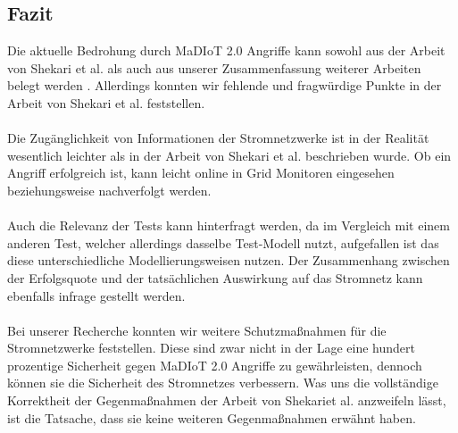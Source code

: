 \documentclass[
    a4paper,
    pagesize,
	pdftex,
    12pt,
]{scrartcl}
\begin{document}
\begin{multicols}{2}
\section{Fazit}
Die aktuelle Bedrohung durch MaDIoT 2.0 Angriffe kann sowohl aus der Arbeit von Shekari et al. als auch aus unserer Zusammenfassung weiterer Arbeiten belegt werden \cite{280016}. Allerdings konnten wir fehlende und fragwürdige Punkte in der Arbeit von Shekari et al. feststellen. \\ \\ Die Zugänglichkeit von Informationen der Stromnetzwerke ist in der Realität wesentlich leichter als in der Arbeit von Shekari et al. beschrieben wurde. Ob ein Angriff erfolgreich ist, kann leicht online in \glqq Grid Monitoren\grqq{} eingesehen beziehungsweise nachverfolgt werden. \\ \\
Auch die Relevanz der Tests kann hinterfragt werden, da im Vergleich mit einem anderen Test, welcher allerdings dasselbe Test-Modell nutzt, aufgefallen ist das diese unterschiedliche Modellierungsweisen nutzen. Der Zusammenhang zwischen der Erfolgsquote und der tatsächlichen Auswirkung auf das Stromnetz kann ebenfalls infrage gestellt werden.\\ \\ Bei unserer Recherche konnten wir weitere Schutzmaßnahmen für die Stromnetzwerke feststellen. Diese sind zwar nicht in der Lage eine hundert prozentige Sicherheit gegen MaDIoT 2.0 Angriffe zu gewährleisten, dennoch können sie die Sicherheit des Stromnetzes verbessern. Was uns die vollständige Korrektheit der Gegenmaßnahmen der Arbeit von Shekariet al. anzweifeln lässt, ist die Tatsache, dass sie keine weiteren Gegenmaßnahmen erwähnt haben.
\end{multicols}
\newpage



\end{document}

